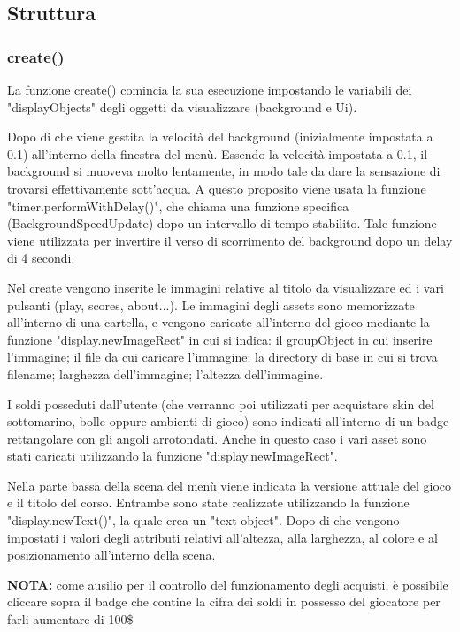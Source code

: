 \documentclass[15pt]{article}
\begin{document}
\subsection{Struttura}

\subsubsection{create()}
La funzione create() comincia la sua esecuzione impostando le variabili dei "displayObjects" degli oggetti da visualizzare (background e Ui).

Dopo di che viene gestita la velocità del background (inizialmente impostata a 0.1) all'interno della finestra del menù. 
Essendo la velocità impostata a 0.1, il background si muoveva molto lentamente, 
in modo tale da dare la sensazione di trovarsi effettivamente sott'acqua. 
A questo proposito viene usata la funzione "timer.performWithDelay()", 
che chiama una funzione specifica (BackgroundSpeedUpdate) dopo un intervallo di tempo stabilito. 
Tale funzione viene utilizzata per invertire il verso di scorrimento del background dopo un delay di 4 secondi.

Nel create vengono inserite le immagini relative al titolo da visualizzare ed i vari pulsanti (play, scores, about...). Le immagini degli assets sono memorizzate all'interno di una cartella, e vengono caricate all'interno del gioco mediante la funzione "display.newImageRect" in cui si indica: il groupObject in cui inserire l'immagine; il file da cui caricare l'immagine; la directory di base in cui si trova filename; larghezza dell'immagine; l'altezza dell'immagine. 

I soldi posseduti dall'utente (che verranno poi utilizzati per acquistare skin del sottomarino, bolle oppure ambienti di gioco) sono indicati all'interno di un badge rettangolare con gli angoli arrotondati. Anche in questo caso i vari asset sono stati caricati utilizzando la funzione "display.newImageRect". 

Nella parte bassa della scena del menù viene indicata la versione attuale del gioco e il titolo del corso. Entrambe sono state realizzate utilizzando la funzione "display.newText()", la quale crea un "text object". Dopo di che vengono impostati i valori degli attributi relativi all'altezza, alla larghezza, al colore e al posizionamento all'interno della scena. 

\textbf{NOTA:} come ausilio per il controllo del funzionamento degli acquisti, è possibile cliccare sopra il badge che contine la cifra dei soldi in possesso del giocatore per farli aumentare di 100\$ 
\end{document}
